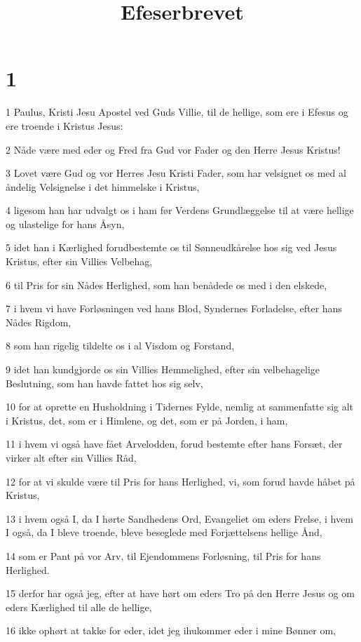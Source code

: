 

\title{Efeserbrevet}


\chapter{1}

\par 1 Paulus, Kristi Jesu Apostel ved Guds Villie, til de hellige, som ere i Efesus og ere troende i Kristus Jesus:
\par 2 Nåde være med eder og Fred fra Gud vor Fader og den Herre Jesus Kristus!
\par 3 Lovet være Gud og vor Herres Jesu Kristi Fader, som har velsignet os med al åndelig Velsignelse i det himmelske i Kristus,
\par 4 ligesom han har udvalgt os i ham før Verdens Grundlæggelse til at være hellige og ulastelige for hans Åsyn,
\par 5 idet han i Kærlighed forudbestemte os til Sønneudkårelse hos sig ved Jesus Kristus, efter sin Villies Velbehag,
\par 6 til Pris for sin Nådes Herlighed, som han benådede os med i den elskede,
\par 7 i hvem vi have Forløsningen ved hans Blod, Syndernes Forladelse, efter hans Nådes Rigdom,
\par 8 som han rigelig tildelte os i al Visdom og Forstand,
\par 9 idet han kundgjorde os sin Villies Hemmelighed, efter sin velbehagelige Beslutning, som han havde fattet hos sig selv,
\par 10 for at oprette en Husholdning i Tidernes Fylde, nemlig at sammenfatte sig alt i Kristus, det, som er i Himlene, og det, som er på Jorden, i ham,
\par 11 i hvem vi også have fået Arvelodden, forud bestemte efter hans Forsæt, der virker alt efter sin Villies Råd,
\par 12 for at vi skulde være til Pris for hans Herlighed, vi, som forud havde håbet på Kristus,
\par 13 i hvem også I, da I hørte Sandhedens Ord, Evangeliet om eders Frelse, i hvem I også, da I bleve troende, bleve beseglede med Forjættelsens hellige Ånd,
\par 14 som er Pant på vor Arv, til Ejendommens Forløsning, til Pris for hans Herlighed.
\par 15 derfor har også jeg, efter at have hørt om eders Tro på den Herre Jesus og om eders Kærlighed til alle de hellige,
\par 16 ikke ophørt at takke for eder, idet jeg ihukommer eder i mine Bønner om,
